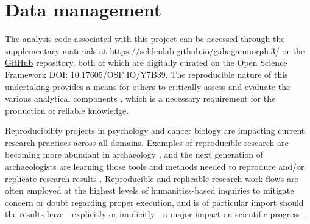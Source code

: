 \documentclass[]{interact}
\theoremstyle{plain}%
\theoremstyle{definition}
\theoremstyle{remark}
\begin{document}
\hypertarget{data-management}{%
\section*{Data management}\label{data-management}}

The analysis code associated with this project can be accessed through
the supplementary materials at
\url{https://seldenlab.github.io/gahaganmorph.3/} or the
\href{https://github.com/seldenlab/gahaganmorph.3}{GitHub} repository,
both of which are digitally curated on the Open Science Framework
\href{https://osf.io/y7b39/}{DOI: 10.17605/OSF.IO/Y7B39}. The
reproducible nature of this undertaking provides a means for others to
critically assess and evaluate the various analytical components
\citep{RN8312,RN8313,RN8299}, which is a necessary requirement for the
production of reliable knowledge.

Reproducibility projects in \href{https://osf.io/ezcuj/}{psychology} and
\href{https://www.cos.io/rpcb}{cancer biology} are impacting current
research practices across all domains. Examples of reproducible research
are becoming more abundant in archaeology
\citep{RN8207,RN8965,RN8154,RN8318,RN9364}, and the next generation of
archaeologists are learning those tools and methods needed to reproduce
and/or replicate research results \citep{RN10760}. Reproducible and
replicable research work flows are often employed at the highest levels
of humanities-based inquiries to mitigate concern or doubt regarding
proper execution, and is of particular import should the results
have---explicitly or implicitly---a major impact on scientific progress
\citep{RN10761}.






\end{document}
